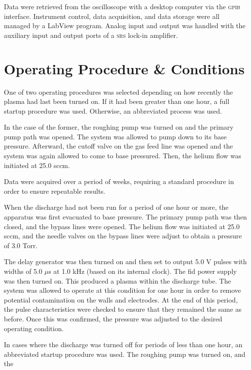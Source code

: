 Data were retrieved from the oscilloscope with a desktop computer via the
\textsc{gpib} interface. Instrument control, data acquisition, and data storage
were all managed by a LabView program. Analog input and output was handled with
the auxiliary input and output ports of a \textsc{srs} 
lock-in amplifier.

\section{Operating Procedure \& Conditions}

One of two operating procedures was selected depending on how recently the
plasma had last been turned on. If it had been greater than one hour, a full
startup procedure was used. Otherwise, an abbreviated process was used. 

In the case of the former, the roughing pump was turned on and the primary pump
path was opened. The system was allowed to pump down to its base pressure.
Afterward, the cutoff valve on the gas feed line was opened and the system was
again allowed to come to base pressured. Then, the helium flow was initiated at
25.0 sccm.

Data were acquired over a period of weeks, requiring a standard procedure in
order to ensure repeatable results. 



When the discharge had not been run for a
period of one hour or more, the apparatus was first evacuated to base pressure.
The primary pump path was then closed, and the bypass lines were opened. The
helium flow was initiated at 25.0 sccm, and the needle valves on the bypass
lines were adjust to obtain a pressure of 3.0 Torr.

The delay generator was then turned on and then set to output 5.0 V pulses with
widths of 5.0 $\mu$s at 1.0 kHz (based on its internal clock). The \acs{fid}
power supply was then turned on. This produced a plasma within the discharge
tube. The system was allowed to operate at this condition for one hour in order
to remove potential contamination on the walls and electrodes. At the end of
this period, the pulse characteristics were checked to ensure that they remained
the same as before. Once this was confirmed, the pressure was adjusted to the
desired operating condition.

In cases where the discharge was turned off for periods of less than one hour,
an abbreviated startup procedure was used. The roughing pump was turned on, and
the 

